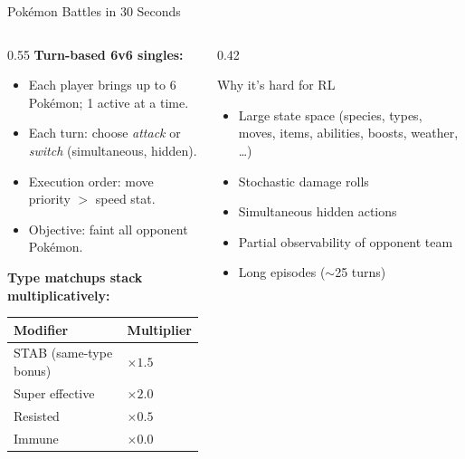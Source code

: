 \documentclass[aspectratio=169, 11pt]{beamer}
\begin{document}
\begin{frame}{Pok\'{e}mon Battles in 30 Seconds}
  \begin{columns}[T]
    \begin{column}{0.55\textwidth}
      \textbf{Turn-based 6v6 singles:}
      \begin{itemize}\setlength{\itemsep}{0.4em}
        \item Each player brings up to 6 Pok\'{e}mon; 1 active at a time.
        \item Each turn: choose \emph{attack} or \emph{switch} (simultaneous,
              hidden).
        \item Execution order: move priority $>$ speed stat.
        \item Objective: faint all opponent Pok\'{e}mon.
      \end{itemize}

      \vspace{0.5em}
      \textbf{Type matchups stack multiplicatively:}

      \vspace{0.3em}
      \centering
      \small
      \begin{tabular}{ll}
        \toprule
        Modifier & Multiplier \\
        \midrule
        STAB (same-type bonus) & $\times 1.5$ \\
        Super effective        & $\times 2.0$ \\
        Resisted               & $\times 0.5$ \\
        Immune                 & $\times 0.0$ \\
        \bottomrule
      \end{tabular}
    \end{column}

    \begin{column}{0.42\textwidth}
      \begin{alertblock}{Why it's hard for RL}
        \begin{itemize}\setlength{\itemsep}{0.3em}
          \item Large state space (species, types, moves, items, abilities, boosts, weather, \ldots)
          \item Stochastic damage rolls
          \item Simultaneous hidden actions
          \item Partial observability of opponent team
          \item Long episodes ($\sim$25 turns)
        \end{itemize}
      \end{alertblock}
    \end{column}
  \end{columns}
\end{frame}
\end{document}
